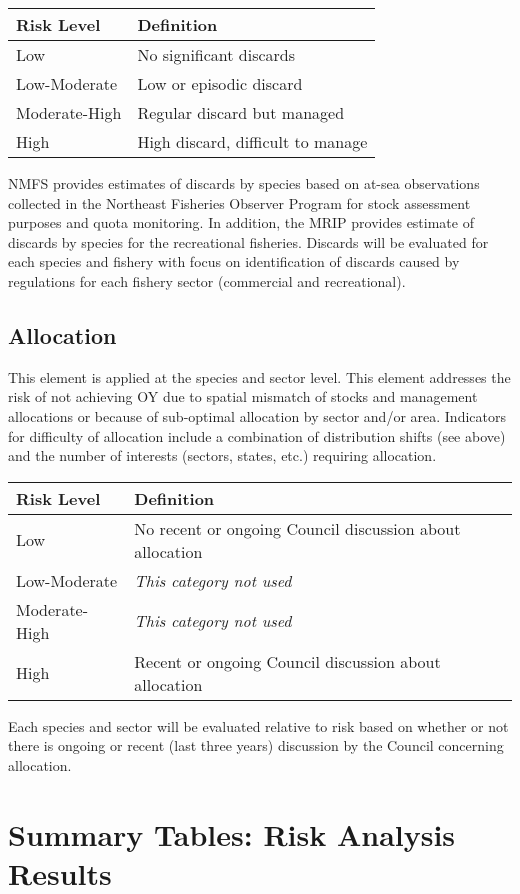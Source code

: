 \documentclass[11pt,]{article}
\begin{document}
\begin{longtable}[]{@{}ll@{}}
\toprule
Risk Level & Definition\tabularnewline
\midrule
\endhead
Low & No significant discards\tabularnewline
Low-Moderate & Low or episodic discard\tabularnewline
Moderate-High & Regular discard but managed\tabularnewline
High & High discard, difficult to manage\tabularnewline
\bottomrule
\end{longtable}

NMFS provides estimates of discards by species based on at-sea
observations collected in the Northeast Fisheries Observer Program for
stock assessment purposes and quota monitoring. In addition, the MRIP
provides estimate of discards by species for the recreational fisheries.
Discards will be evaluated for each species and fishery with focus on
identification of discards caused by regulations for each fishery sector
(commercial and recreational).

\subsection{Allocation}\label{allocation}

This element is applied at the species and sector level. This element
addresses the risk of not achieving OY due to spatial mismatch of stocks
and management allocations or because of sub-optimal allocation by
sector and/or area. Indicators for difficulty of allocation include a
combination of distribution shifts (see above) and the number of
interests (sectors, states, etc.) requiring allocation.

\begin{longtable}[]{@{}ll@{}}
\toprule
Risk Level & Definition\tabularnewline
\midrule
\endhead
Low & No recent or ongoing Council discussion about
allocation\tabularnewline
Low-Moderate & \emph{This category not used}\tabularnewline
Moderate-High & \emph{This category not used}\tabularnewline
High & Recent or ongoing Council discussion about
allocation\tabularnewline
\bottomrule
\end{longtable}

Each species and sector will be evaluated relative to risk based on
whether or not there is ongoing or recent (last three years) discussion
by the Council concerning allocation.

\section{Summary Tables: Risk Analysis
Results}\label{summary-tables-risk-analysis-results}
\end{document}
